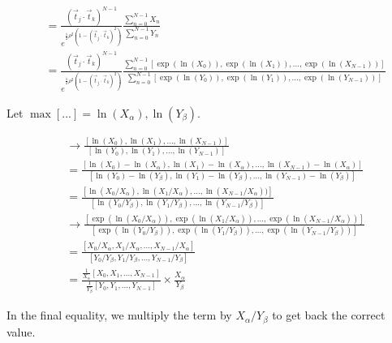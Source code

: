 \documentclass[12pt]{article}
\newcommand{\tjtk}{(\vec{t}_j\cdot\vec{t}_k)}
\begin{document}
   \begin{align}
   &= \frac{\tjtk^{N-1}}{e^{\frac{1}{2}\rho^2(1-\tjtk^2)}} 
   \frac{ \sum_{n=0}^{N-1} X_n } 
   { \sum_{n=0}^{N-1} Y_n } \\
   &= \frac{\tjtk^{N-1}}{e^{\frac{1}{2}\rho^2(1-\tjtk^2)}} 
   \frac{ \sum_{n=0}^{N-1} [\exp(\ln(X_0)),\exp(\ln(X_1)),...,\exp(\ln(X_{N-1}))] } 
   { \sum_{n=0}^{N-1} [\exp(\ln(Y_0)),\exp(\ln(Y_1)),...,\exp(\ln(Y_{N-1}))] }
   \end{align}

Let $\max[...] = \ln(X_\alpha), \ln(Y_\beta)$.

   \begin{align}
   &\rightarrow \frac{[\ln(X_0),\ln(X_1),...,\ln(X_{N-1})]}{[\ln(Y_0),\ln(Y_1),...,\ln(Y_{N-1})]} \\
   &= \frac{[\ln(X_0)-\ln(X_\alpha),\ln(X_1)-\ln(X_\alpha),...,\ln(X_{N-1})-\ln(X_\alpha)]}{[\ln(Y_0)-\ln(Y_\beta),\ln(Y_1)-\ln(Y_\beta),...,\ln(Y_{N-1})-\ln(Y_\beta)]} \\
   &= \frac{[\ln(X_0/X_\alpha),\ln(X_1/X_\alpha),...,\ln(X_{N-1}/X_\alpha))]}{[\ln(Y_0/Y_\beta),\ln(Y_1/Y_\beta),...,\ln(Y_{N-1}/Y_\beta)]} \\
   &\rightarrow \frac{[\exp(\ln(X_0/X_\alpha)),\exp(\ln(X_1/X_\alpha)),...,\exp(\ln(X_{N-1}/X_\alpha))]}{[\exp(\ln(Y_0/Y_\beta)),\exp(\ln(Y_1/Y_\beta)),...,\exp(\ln(Y_{N-1}/Y_\beta))]} \\
   &= \frac{[X_0/X_\alpha,X_1/X_\alpha,...,X_{N-1}/X_\alpha]}{[Y_0/Y_\beta,Y_1/Y_\beta,...,Y_{N-1}/Y_\beta]} \\
   &=\frac{\frac{1}{X_\alpha}[X_0,X_1,...,X_{N-1}]}{\frac{1}{Y_\beta}[Y_0,Y_1,...,Y_{N-1}]} \times \frac{X_\alpha}{Y_\beta}
   \end{align}

In the final equality, we multiply the term by $X_\alpha/Y_\beta$ to get back the correct value.
\end{document}
